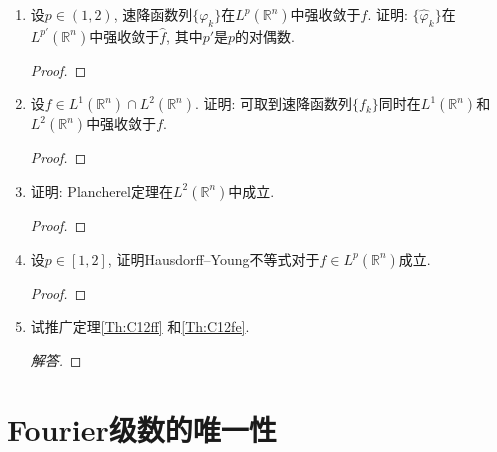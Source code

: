 \begin{quizb}
\begin{enumerate}
\begin{proof}
    有\begin{align*}
        E'(t)&=2\int_{\R^n}uu_t=2\int_{\R^n}u\Delta_{\boldsymbol{x}}u\\
        &=-2\int_{\R^n}|\nabla_{\boldsymbol{x}}u|^2\leqslant0,
    \end{align*}
    结合$E(0)=0$得到$E(t)\equiv0$，从而$u\equiv0$。
    可惜这是错误的解答，分部积分产生的边界项未必消失；
    况且本题的结论也是错误的，热传导方程的解$u$并不是唯一的。
\end{proof}
\item 设\(p\in(1,2)\), 速降函数列\(\{\varphi_k\}\)在\(L^p(\mathbb{R}^n)\)中强收敛于\(f\). 证明: \(\{\widehat{\varphi}_k\}\)在\(L^{p'}(\mathbb{R}^n)\)中强收敛于\(\widehat{f}\), 其中\(p'\)是\(p\)的对偶数.
\begin{proof}
	
\end{proof}
\item 设\(f\in L^1(\mathbb{R}^n)\cap L^2(\mathbb{R}^n)\). 
证明: 可取到速降函数列\(\{f_k\}\)同时在\(L^1(\mathbb{R}^n)\)和\(L^2(\mathbb{R}^n)\)中强收敛于\(f\).
\begin{proof}
	
\end{proof}
\item 证明: Plancherel定理在\(L^2(\mathbb{R}^n)\)中成立.
\begin{proof}
	
\end{proof}
\item 设\(p\in[1,2]\), 证明Hausdorff--Young不等式对于\(f\in L^p(\mathbb{R}^n)\)成立.
\begin{proof}
	
\end{proof}
\item 试推广定理\ref{Th:C12ff} 和\ref{Th:C12fe}.
\begin{proof}[解答]
	
\end{proof}
\end{enumerate}
\end{quizb}

\section{Fourier级数的唯一性}
